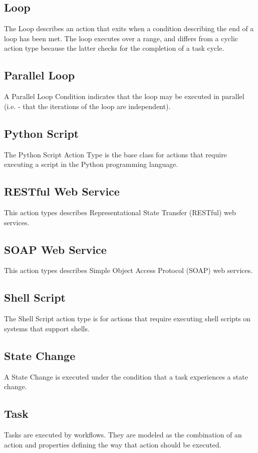 			\subsection{
			Loop
			}
			The Loop describes an action that exits when a condition describing the end of a loop has been met. The loop executes over a range, and differs from a cyclic action type because the latter checks for the completion of a task cycle.
			\subsection{
			Parallel Loop
			}
			A Parallel Loop Condition indicates that the loop may be executed in parallel (i.e. - that the iterations of the loop are independent).
			\subsection{
			Python Script
			}
			The Python Script Action Type is the base class for actions that require executing a script in the Python programming language.
			\subsection{
			RESTful Web Service
			}
			This action types describes Representational State Transfer (RESTful) web services.
			\subsection{
			SOAP Web Service
			}
			This action types describes Simple Object Access Protocol (SOAP) web services.
			\subsection{
			Shell Script
			}
			The Shell Script action type is for actions that require executing shell scripts on systems that support shells.
			\subsection{
			State Change
			}
			A State Change is executed under the condition that a task experiences a state change.
			\subsection{
			Task
			}
			Tasks are executed by workflows. They are modeled as the combination of an action and properties defining the way that action should be executed.

